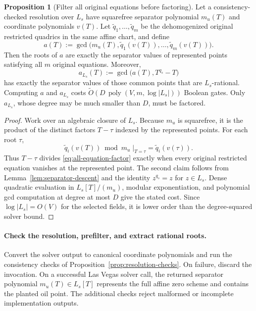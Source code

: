 \documentclass[11pt,a4paper]{article}
\theoremstyle{definition}
\newtheorem{proposition}[theorem]{Proposition}
\theoremstyle{remark}
\newcommand{\softO}{\widetilde O}
\begin{document}
\begin{proposition}[Filter all original equations before factoring]\label{prop:separator-prefilter}
Let a consistency-checked resolution over $L_s$ have squarefree separator polynomial $m_u(T)$ and coordinate polynomials $v(T)$.  Let $\widetilde q_1,\ldots,\widetilde q_m$ be the dehomogenized original restricted quadrics in the same affine chart, and define
\begin{equation}\label{eq:all-equation-factor}
a(T):=\gcd\bigl(m_u(T),\widetilde q_1(v(T)),\ldots,\widetilde q_m(v(T))\bigr).
\end{equation}
Then the roots of $a$ are exactly the separator values of represented points satisfying all $m$ original equations.  Moreover,
\begin{equation}\label{eq:rational-factor}
a_{L_s}(T):=\gcd\bigl(a(T),T^{q_s}-T\bigr)
\end{equation}
has exactly the separator values of those common points that are $L_s$-rational.  Computing $a$ and $a_{L_s}$ costs $\softO\!\left(D\,\operatorname{poly}(V,m,\log|L_s|)\right)$ Boolean gates.  Only $a_{L_s}$, whose degree may be much smaller than $D$, must be factored.
\end{proposition}

\begin{proof}
Work over an algebraic closure of $L_s$.  Because $m_u$ is squarefree, it is the product of the distinct factors $T-\tau$ indexed by the represented points.  For each root $\tau$,
\[
\widetilde q_i(v(T))\bmod m_u\;\big|_{T=\tau}=\widetilde q_i(v(\tau)).
\]
Thus $T-\tau$ divides \eqref{eq:all-equation-factor} exactly when every original restricted equation vanishes at the represented point.  The second claim follows from Lemma~\ref{lem:separator-descent} and the identity $z^{q_s}=z$ for $z\in L_s$.  Dense quadratic evaluation in $L_s[T]/(m_u)$, modular exponentiation, and polynomial gcd computation at degree at most $D$ give the stated cost.  Since $\log|L_s|=O(V)$ for the selected fields, it is lower order than the degree-squared solver bound.
\end{proof}

\paragraph{Check the resolution, prefilter, and extract rational roots.}
Convert the solver output to canonical coordinate polynomials and run the consistency checks of Proposition~\ref{prop:resolution-checks}.  On failure, discard the invocation.  On a successful Las Vegas solver call, the returned separator polynomial $m_u(T)\in L_s[T]$ represents the full affine zero scheme and contains the planted oil point.  The additional checks reject malformed or incomplete implementation outputs.
\end{document}

